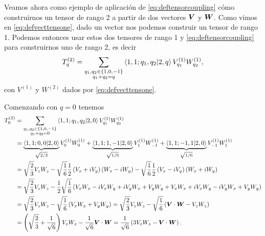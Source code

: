 \documentclass[10pt, a4paper]{article}
\numberwithin{equation}{subsection}
\begin{document}
Veamos ahora como ejemplo de aplicación de \eqref{eq:deftensorcoupling} cómo
construirnos un tensor de rango 2 a partir de dos vectores $\vb*{V}$ y
$\vb*{W}$. Como vimos en \eqref{eq:defvecttensone}, dado un vector nos podemos
construir un tensor de rango 1. Podemos entonces usar estos dos tensores de
rango 1 y \eqref{eq:deftensorcoupling} para construirnos uno de rango 2, es
decir
\begin{equation}
  T^{(2)}_q = \sum_{\substack{q_1,q_2\in\set{1,0,-1} \\ q_1 + q_2 = q}}
    \ClebschGordan{1}{1}{q_1}{q_2}{2}{q} V^{(1)}_{q_1} W^{(1)}_{q_2},
\end{equation}
con $V^{(1)}$ y $W^{(2)}$ dados por \eqref{eq:defvecttensone}.

Comenzando con $q = 0$ tenemos
\begin{align}
  T^{(2)}_0 &= \sum_{\substack{q_1,q_2\in\set{1,0,-1} \\ q_1 + q_2 = 0}}
    \ClebschGordan{1}{1}{q_1}{q_2}{2}{0} V^{(1)}_{q_1} W^{(1)}_{q_2} \nonumber \\
  &= \underbrace{\ClebschGordan{1}{1}{0}{0}{2}{0}}_{\sqrt{2/3}} V^{(1)}_{0} W^{(1)}_{0} +
    \underbrace{\ClebschGordan{1}{1}{1}{-1}{2}{0}}_{\sqrt{1/6}} V^{(1)}_{1} W^{(1)}_{-1} +
    \underbrace{\ClebschGordan{1}{1}{-1}{1}{2}{0}}_{\sqrt{1/6}} V^{(1)}_{-1} W^{(1)}_{1}
    \nonumber \\
  &= \sqrt{\frac{2}{3}} V_z W_z
    -\sqrt{\frac{1}{6}}\frac{1}{2}\left(V_x+iV_y\right)\left(W_x-iW_y\right)
    -\sqrt{\frac{1}{6}}\frac{1}{2}\left(V_x-iV_y\right)\left(W_x+iW_y\right)
    \nonumber \\
  &= \sqrt{\frac{2}{3}} V_z W_z
    -\frac{1}{2}\sqrt{\frac{1}{6}}\left(V_xW_x -iV_xW_y +iV_yW_x + V_yW_y
    +V_xW_x + iV_xW_y - iV_yW_x + V_yW_y\right) \nonumber \\
  &= \sqrt{\frac{2}{3}} V_z W_z
    -\sqrt{\frac{1}{6}}\left(V_xW_x + V_yW_y\right) 
    = \sqrt{\frac{2}{3}} V_z W_z -\sqrt{\frac{1}{6}}\left(\vect{V}\cdot\vect{W}
    -V_zW_z\right) \nonumber \\
  &= \left(\sqrt{\frac{2}{3}} + \frac{1}{\sqrt{6}}\right) V_z W_z
    -\frac{1}{\sqrt{6}}\vect{V}\cdot\vect{W}
    = \frac{1}{\sqrt{6}}\left(3V_z W_z - \vect{V}\cdot\vect{W}\right).
\end{align}
\end{document}
